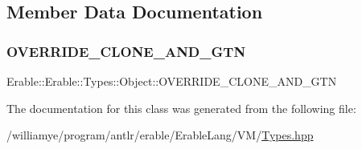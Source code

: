 \subsection{Member Data Documentation}
\mbox{\label{class_erable_1_1_erable_1_1_types_1_1_object_a10aa875c72a24a0cce80136f6b20dc36}} 
\subsubsection{\texorpdfstring{OVERRIDE\_CLONE\_AND\_GTN}{OVERRIDE\_CLONE\_AND\_GTN}}
{\footnotesize\ttfamily Erable\+::\+Erable\+::\+Types\+::\+Object\+::\+O\+V\+E\+R\+R\+I\+D\+E\+\_\+\+C\+L\+O\+N\+E\+\_\+\+A\+N\+D\+\_\+\+G\+TN}



The documentation for this class was generated from the following file\+:\begin{DoxyCompactItemize}
\item 
/williamye/program/antlr/erable/\+Erable\+Lang/\+V\+M/\mbox{\hyperlink{_types_8hpp}{Types.\+hpp}}\end{DoxyCompactItemize}
